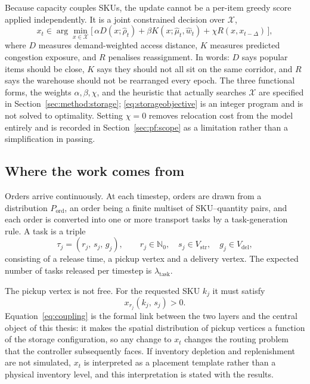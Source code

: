 \documentclass[../main.tex]{subfiles}
\begin{document}
Because capacity couples SKUs, the update cannot be a per-item greedy score
applied independently. It is a joint constrained decision over $\mathcal{X}$,
\begin{equation}
  x_t \in \arg\min_{x \in \mathcal{X}}
    \bigl[\, \alpha D(x; \hat{\rho}_t)
       + \beta K(x; \hat{\mu}_t, \hat{w}_t)
       + \chi R(x, x_{t-\Delta}) \,\bigr],
  \label{eq:storageobjective}
\end{equation}
where $D$ measures demand-weighted access distance, $K$ measures predicted
congestion exposure, and $R$ penalises reassignment. In words: $D$ says popular
items should be close, $K$ says they should not all sit on the same corridor, and
$R$ says the warehouse should not be rearranged every epoch. The three functional
forms, the weights $\alpha, \beta, \chi$, and the heuristic that actually
searches $\mathcal{X}$ are specified in Section~\ref{sec:method:storage};
\eqref{eq:storageobjective} is an integer program and is not solved to
optimality. Setting $\chi = 0$ removes relocation cost from the model entirely
and is recorded in Section~\ref{sec:pf:scope} as a limitation rather than a
simplification in passing.

\subsection{Where the work comes from}
\label{sec:pf:tasks}

Orders arrive continuously. At each timestep, orders are drawn from a
distribution $P_{\mathrm{ord}}$, an order being a finite multiset of
SKU--quantity pairs, and each order is converted into one or more transport tasks
by a task-generation rule. A task is a triple
\begin{equation}
  \tau_j = (r_j,\, s_j,\, g_j), \qquad
  r_j \in \mathbb{N}_0,\quad s_j \in V_{\mathrm{str}},\quad g_j \in V_{\mathrm{del}},
  \label{eq:task}
\end{equation}
consisting of a release time, a pickup vertex and a delivery vertex. The expected
number of tasks released per timestep is $\lambda_{\mathrm{task}}$.

The pickup vertex is not free. For the requested SKU $k_j$ it must satisfy
\begin{equation}
  x_{r_j}(k_j,\, s_j) > 0 .
  \label{eq:coupling}
\end{equation}
Equation~\eqref{eq:coupling} is the formal link between the two layers and the
central object of this thesis: it makes the spatial distribution of pickup
vertices a function of the storage configuration, so any change to $x_t$ changes
the routing problem that the controller subsequently faces. If inventory
depletion and replenishment are not simulated, $x_t$ is interpreted as a
placement template rather than a physical inventory level, and this
interpretation is stated with the results.
\end{document}
